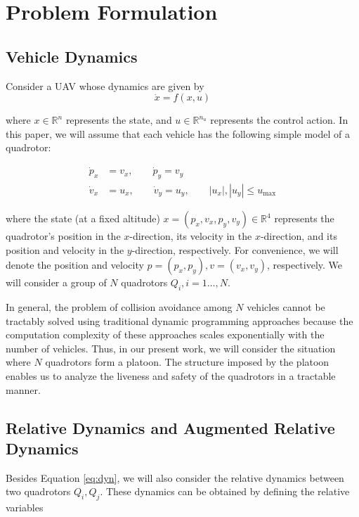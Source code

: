 \section{Problem Formulation \label{sec:formulation}}
\subsection{Vehicle Dynamics}
Consider a UAV whose dynamics are given by
\begin{equation}
\dot{x} = f(x,u)
\end{equation}

\noindent where $x\in\mathbb{R}^n$ represents the state, and $u\in\mathbb{R}^{n_u}$ represents the control action. In this paper, we will assume that each vehicle has the following simple model of a quadrotor:

\begin{equation} \label{eq:dyn}
\begin{aligned}
\dot{p}_x &= v_x, \qquad \dot{p}_y = v_y  \\
\dot{v}_x &= u_x, \qquad \dot{v}_y = u_y, \qquad |u_x|,|u_y| \le u_\text{max}
\end{aligned}
\end{equation}

\noindent where the state (at a fixed altitude) $x=(p_x, v_x, p_y, v_y)\in\mathbb{R}^4$ represents the quadrotor's position in the $x$-direction, its velocity in the $x$-direction, and its position and velocity in the $y$-direction, respectively. For convenience, we will denote the position and velocity $p=(p_x, p_y),v=(v_x,v_y)$, respectively. We will consider a group of $N$ quadrotors $Q_i, i=1\ldots,N$.

In general, the problem of collision avoidance among $N$ vehicles cannot be tractably solved using traditional dynamic programming approaches because the computation complexity of these approaches scales exponentially with the number of vehicles. Thus, in our present work, we will consider the situation where $N$ quadrotors form a platoon. The structure imposed by the platoon enables us to analyze the liveness and safety of the quadrotors in a tractable manner.

\subsection{Relative Dynamics and Augmented Relative Dynamics}
Besides Equation \eqref{eq:dyn}, we will also consider the relative dynamics between two quadrotors $Q_i,Q_j$. These dynamics can be obtained by defining the relative variables

